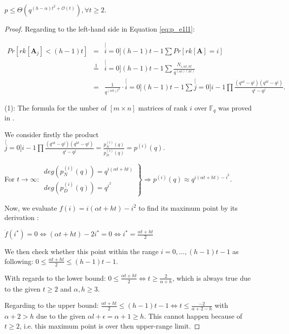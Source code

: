 \begin{lem}
$p\leq\Theta\left(q^{\left(h-\alpha\right)t^{2}+\mathcal{O}(t)}\right),\forall t\geq2$.
\end{lem}
\begin{proof}
Regarding to the left-hand side in Equation \ref{eq:p_e1l1}:

\begin{eqnarray}
Pr\left[rk\left[\boldsymbol{A}_{j}\right]<(h-1)t\right] & = & \stackrel[i=0]{(h-1)t-1}{\mathop{\sum}}Pr\left[rk\left[\boldsymbol{A}\right]=i\right]\nonumber \\
 & \overset{1}{=} & \stackrel[i=0]{(h-1)t-1}{\mathop{\sum}}\frac{N_{i,\alpha t,ht}}{q^{\left(\alpha t\right)\left(ht\right)}}\nonumber \\
 & = & \frac{1}{q^{\left(\alpha h\right)t^{2}}}\cdot\stackrel[i=0]{(h-1)t-1}{\mathop{\sum}}\stackrel[j=0]{i-1}{\mathop{\prod}}\frac{\left(q^{\alpha t}-q^{j}\right)\left(q^{ht}-q^{j}\right)}{q^{i}-q^{j}}.\label{eq:general_nw_calc_p}
\end{eqnarray}

(1): The formula for the umber of $\left[m\times n\right]$ matrices
of rank $i$ over $\ensuremath{\mathbb{F}}_{q}$ was proved in \cite{Overbeck:2007}.

We consider firstly the product$\stackrel[j=0]{i-1}{\mathop{\prod}}\frac{\left(q^{\alpha t}-q^{j}\right)\left(q^{ht}-q^{j}\right)}{q^{i}-q^{j}}=\frac{p_{N}^{(i)}(q)}{p_{D}^{(i)}(q)}=p^{(i)}(q)$.

For $t\rightarrow\infty$: $\left.\begin{array}{c}
deg\left(p_{N}^{(i)}(q)\right)=q^{i(\alpha t+ht)}\\
deg\left(p_{D}^{(i)}(q)\right)=q^{i^{2}}
\end{array}\right\} \Rightarrow p^{(i)}(q)\approx q^{i(\alpha t+ht)-i^{2}}.$

Now, we evaluate $f(i)=i(\alpha t+ht)-i^{2}$ to find its maximum
point by its derivation : 

$\dot{f}(i^{*})=0\Leftrightarrow(\alpha t+ht)-2i^{*}=0\Leftrightarrow i^{*}=\frac{\alpha t+ht}{2}$

We then check whether this point within the range $i=0,\ldots,(h-1)t-1$
as following: $0\leq\frac{\alpha t+ht}{2}\leq(h-1)t-1$.

With regards to the lower bound: $0\leq\frac{\alpha t+ht}{2}\Leftrightarrow t\geq\frac{2}{\alpha+h}$,
which is always true due to the given $t\geq2$ and $\alpha,h\geq3$.

Regarding to the upper bound: $\frac{\alpha t+ht}{2}\leq(h-1)t-1\Leftrightarrow t\leq\frac{-2}{\alpha+2-h}$
with $\alpha+2>h$ due to the given $\alpha l+\epsilon=\alpha+1\geq h$.
This cannot happen because of $t\geq2$, i.e. this maximum point is
over then upper-range limit.


\end{proof}
